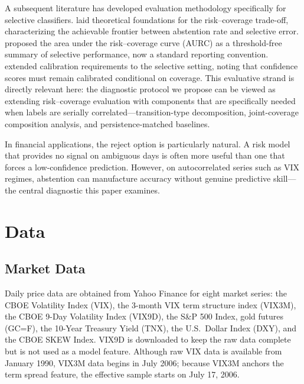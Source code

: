 \documentclass[12pt]{article}
\begin{document}
A subsequent literature has developed evaluation methodology specifically for selective
classifiers. \citet{elyaniv2010} laid theoretical foundations for the risk--coverage trade-off,
characterizing the achievable frontier between abstention rate and selective error.
\citet{geifman2019} proposed the area under the risk--coverage curve (AURC) as a threshold-free
summary of selective performance, now a standard reporting convention. \citet{fisch2022}
extended calibration requirements to the selective setting, noting that confidence scores must
remain calibrated conditional on coverage. This evaluative strand is directly relevant here:
the diagnostic protocol we propose can be viewed as extending risk--coverage evaluation with
components that are specifically needed when labels are serially correlated---transition-type
decomposition, joint-coverage composition analysis, and persistence-matched baselines.

In financial applications, the reject option is particularly natural. A risk model that provides
no signal on ambiguous days is often more useful than one that forces a low-confidence prediction.
However, on autocorrelated series such as VIX regimes, abstention can manufacture accuracy without
genuine predictive skill---the central diagnostic this paper examines.

\section{Data}
\label{sec:data}

\subsection{Market Data}

Daily price data are obtained from Yahoo Finance for eight market series: the CBOE Volatility
Index (VIX), the 3-month VIX term structure index (VIX3M), the CBOE 9-Day Volatility Index
(VIX9D), the S\&P 500 Index, gold futures (GC=F), the 10-Year Treasury Yield (TNX), the U.S.\
Dollar Index (DXY), and the CBOE SKEW Index. VIX9D is downloaded to keep the raw data complete
but is not used as a model feature. Although raw VIX data is available from January 1990, VIX3M
data begins in July 2006; because VIX3M anchors the term spread feature, the effective sample
starts on July 17, 2006.
\end{document}

